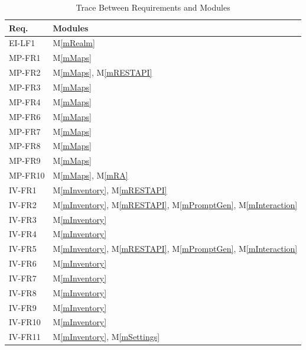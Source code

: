 \documentclass[12pt, titlepage]{article}
\newcommand{\mref}[1]{M\ref{#1}}
\begin{document}
\begin{table}[H]
\centering
\begin{tabular}{p{} p{}}
\toprule
\textbf{Req.} & \textbf{Modules}\\
\midrule
EI-LF1 & \mref{mRealm}\\
MP-FR1 & \mref{mMaps}\\
MP-FR2 & \mref{mMaps}, \mref{mRESTAPI}\\
MP-FR3 & \mref{mMaps}\\
MP-FR4 & \mref{mMaps}\\
MP-FR6 & \mref{mMaps}\\
MP-FR7 & \mref{mMaps}\\
MP-FR8 & \mref{mMaps}\\
MP-FR9 & \mref{mMaps}\\
MP-FR10 & \mref{mMaps}, \mref{mRA}\\
IV-FR1 & \mref{mInventory}, \mref{mRESTAPI}\\
IV-FR2 & \mref{mInventory}, \mref{mRESTAPI}, \mref{mPromptGen}, \mref{mInteraction}\\
IV-FR3 & \mref{mInventory}\\
IV-FR4 & \mref{mInventory}\\
IV-FR5 & \mref{mInventory}, \mref{mRESTAPI}, \mref{mPromptGen}, \mref{mInteraction}\\
IV-FR6 & \mref{mInventory}\\
IV-FR7 & \mref{mInventory}\\
IV-FR8 & \mref{mInventory}\\
IV-FR9 & \mref{mInventory}\\
IV-FR10 & \mref{mInventory}\\
IV-FR11 & \mref{mInventory}, \mref{mSettings}\\
\bottomrule
\end{tabular}
\caption{Trace Between Requirements and Modules}
\label{TblRT}
\end{table}
\end{document}
